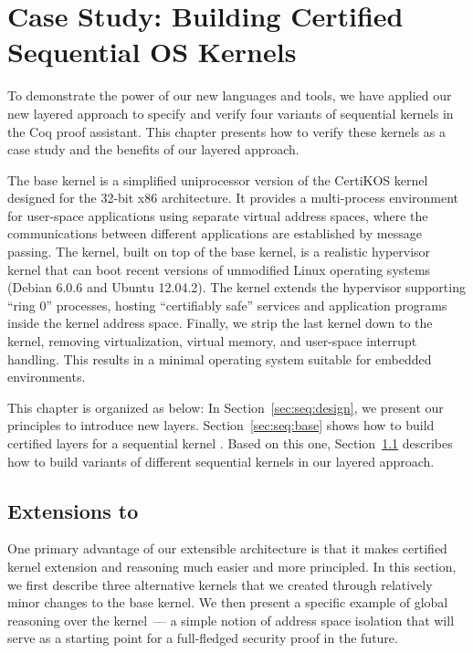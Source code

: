 \chapter{Case Study: Building Certified Sequential OS Kernels}
\label{chap:seq:kernel}
To demonstrate the power of our new languages and tools,
we have applied our new layered approach to specify and
verify four variants of sequential \mCTOS{} kernels in the Coq proof assistant.
This chapter presents how to verify  these kernels as a case study and the benefits of our layered approach.

The \mCTOSbase{} base kernel is a simplified uniprocessor version of
the CertiKOS kernel~\cite{gu11} designed for the 32-bit x86
architecture.  It provides a multi-process environment for user-space
applications using separate virtual address spaces, where the
communications between different applications are established by
message passing.  The \mCTOShyper{} kernel, built on top of the base
kernel, is a realistic hypervisor kernel that can boot recent versions
of unmodified Linux operating systems (Debian 6.0.6 and Ubuntu
12.04.2).  The \mCTOSringz{} kernel extends the hypervisor supporting
``ring 0'' processes, hosting ``certifiably safe'' services and
application programs inside the kernel address space.  Finally, we
strip the last kernel down to the \mCTOSembed{} kernel, removing
virtualization, virtual memory, and user-space interrupt handling.
This results in a minimal operating system suitable for embedded
environments.

This chapter is organized as below:
In Section~\ref{sec:seq:design}, we present
our principles to introduce new layers.
Section~\ref{sec:seq:base} shows
how to build certified layers for  a sequential kernel
\mCTOS{}.
Based on this one,
Section~\ref{sec:seq:extend}
describes how to build variants of different sequential
kernels in our layered approach.






\section{Extensions to \mCTOS{}}
\label{sec:seq:extend}

One primary advantage of our extensible architecture is that it makes
certified kernel extension and reasoning much easier and more principled. 
In this section, we first describe three alternative \mCTOSbase{} kernels
that we created through relatively minor changes to the base kernel. We
then present a specific example of global reasoning over the \mCTOSbase{} 
kernel~--- a simple notion of address space isolation that will serve as 
a starting point for a full-fledged security proof in the future.

